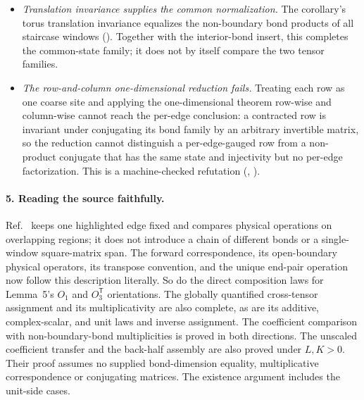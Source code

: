\documentclass{article}
\begin{document}
\begin{itemize}
          injectivity information.
    \item \emph{Translation invariance supplies the common normalization.}
          The corollary's torus translation invariance equalizes the non-boundary
          bond products of all staircase windows
          ().  Together
          with the interior-bond insert, this completes the common-state family; it
          does not by itself compare the two tensor families.
    \item \emph{The row-and-column one-dimensional reduction fails.} Treating
          each row as one coarse site and applying the one-dimensional theorem
          row-wise and column-wise cannot reach the per-edge conclusion: a
          contracted row is invariant under conjugating its bond family by an
          arbitrary invertible matrix, so the reduction cannot distinguish a
          per-edge-gauged row from a non-product conjugate that has the same state
          and injectivity but no per-edge factorization. This is a machine-checked
          refutation
          (,
          ).
\end{itemize}

\paragraph{5. Reading the source faithfully.}
Ref.~\cite{Molnar2018NormalPEPS} keeps one highlighted edge fixed and compares physical operations
on overlapping regions; it does not introduce a chain of different bonds or
a single-window square-matrix span.  The forward correspondence, its
open-boundary physical operators, its transpose convention, and the unique
end-pair operation now follow this description literally.  So do the direct
composition laws for Lemma~5's $O_1$ and $O_3^{\mathsf T}$ orientations.  The
globally quantified cross-tensor assignment and its multiplicativity are also
complete, as are its additive, complex-scalar, and unit laws and inverse
assignment. The coefficient comparison with non-boundary-bond multiplicities
is proved in both directions. The unscaled coefficient transfer and the back-half assembly are also
proved under $L,K>0$. Their proof assumes no supplied bond-dimension
equality, multiplicative correspondence or conjugating matrices.
The existence argument includes the unit-side cases.
\end{document}
